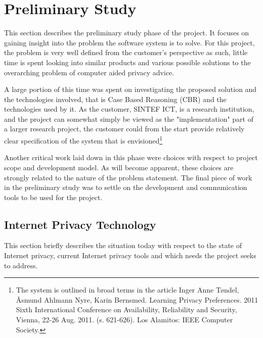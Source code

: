  

\chapter{Preliminary Study\label{prelim}}


\minitoc

This section describes the preliminary study phase of the project. It focuses on gaining insight into the problem the software system is to solve. For this project, the problem is very well defined from the customer's perspective as such, little time is spent looking into similar products and various possible solutions to the overarching problem of computer aided privacy advice.

A large portion of this time was spent on investigating the proposed solution and the technologies involved, that is Case Based Reasoning (CBR) and the technologies used by it. As the customer, SINTEF ICT, is a research institution, and the project can somewhat simply be viewed as the "implementation" part of a larger research project, the customer could from the start provide relatively clear specification of the system that is envisioned\footnote{The system is outlined in broad terms in the article Inger Anne T{\o}ndel, {\AA}smund Ahlmann Nyre, Karin Bernsmed. Learning Privacy Preferences. 2011 Sixth International Conference on Availability, Reliability and Security, Vienna, 22-26 Aug. 2011. (s. 621-626). Los Alamitos: IEEE Computer Society.}

Another critical work laid down in this phase were choices with respect to project scope and development model. As will become apparent, these choices are strongly related to the nature of the problem statement. The final piece of work in the preliminary study was to settle on the development and communication tools to be used for the project.

\section{Internet Privacy Technology}

This section briefly describes the situation today with respect to the state of Internet privacy, current Internet privacy tools and which needs the project seeks to address.

